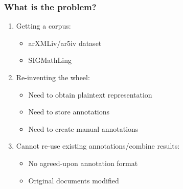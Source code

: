 \documentclass[aspectratio=169]{beamer}
\begin{document}
\begin{frame}
    \frametitle{What is the problem?}
    \begin{enumerate}
        \item Getting a corpus:
            \begin{itemize}
                \item arXMLiv/ar5iv dataset~\cite{SML:arXMLiv:2020}
                \item SIGMathLing~\cite{SIGMathLing:on}
            \end{itemize}
        \item Re-inventing the wheel:
            \begin{itemize}
                \item Need to obtain plaintext representation
                \item Need to store annotations
                \item Need to create manual annotations
            \end{itemize}
        \item Cannot re-use existing annotations/combine results:
            \begin{itemize}
                \item No agreed-upon annotation format
                \item Original documents modified
            \end{itemize}
    \end{enumerate}
\end{frame}
\end{document}
